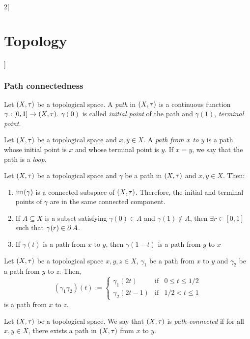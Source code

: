 \documentclass[../../../main.tex]{subfiles}
\begin{document}
\begin{multicols}{2}[\section{Topology}]
  \subsubsection{Path connectedness}
  \begin{definition}
    Let $(X,\tau)$ be a topological space. A \emph{path} in $(X,\tau)$ is a continuous function $\gamma:[0,1]\rightarrow (X,\tau)$. $\gamma(0)$ is called \emph{initial point} of the path and $\gamma(1)$, \emph{terminal point}.
  \end{definition}
  \begin{definition}
    Let $(X,\tau)$ be a topological space and $x,y\in X$. A \emph{path from $x$ to $y$} is a path whose initial point is $x$ and whose terminal point is $y$. If $x=y$, we say that the path is a \emph{loop}.
  \end{definition}
  \begin{proposition}
    Let $(X,\tau)$ be a topological space and $\gamma$ be a path in $(X,\tau)$ and $x,y\in X$. Then:
    \begin{enumerate}
      \item $\operatorname{im}(\gamma)$ is a connected subspace of $(X,\tau)$. Therefore, the initial and terminal points of $\gamma$ are in the same connected component.
      \item If $A\subseteq X$ is a subset satisfying $\gamma(0)\in A$ and $\gamma(1)\notin A$, then $\exists r\in[0,1]$ such that $\gamma(r)\in\operatorname{\partial} A$.
      \item If $\gamma(t)$ is a path from $x$ to $y$, then  $\gamma(1-t)$ is a path from $y$ to $x$
    \end{enumerate}
  \end{proposition}
  \begin{proposition}
    Let $(X,\tau)$ be a topological space $x,y,z\in X$, $\gamma_1$ be a path from $x$ to $y$ and $\gamma_2$ be a path from $y$ to $z$. Then, $$(\gamma_1\gamma_2)(t):=\left\{
      \begin{array}{lcc}
        \gamma_1(2t)   & \text{if} & 0\leq t\leq 1/2 \\
        \gamma_2(2t-1) & \text{if} & 1/2 <t\leq 1
      \end{array}
      \right.$$
    is a path from $x$ to $z$.
  \end{proposition}
  \begin{definition}
    Let $(X,\tau)$ be a topological space. We say that $(X,\tau)$ is \emph{path-connected} if for all $x,y\in X$, there exists a path in $(X,\tau)$ from $x$ to $y$.
  \end{definition}

\end{multicols}
\end{document}
